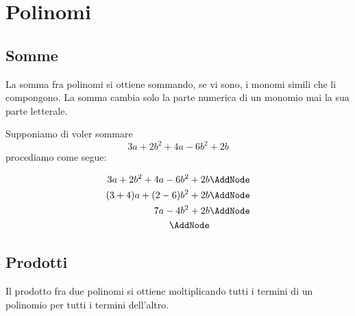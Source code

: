 \chapter{Polinomi}
\label{cha:polinomi}
\minitoc
\mtcskip                                %
\minilof                                %
\mtcskip                                %
\minilot
\section{Somme}
\label{sec:somme}
La somma fra polinomi si ottiene sommando, se vi sono, i monomi simili che li compongono. La somma cambia solo la parte numerica di un monomio mai la sua parte letterale. 
\begin{esempio}
Supponiamo di voler sommare\[ 3a+2b^2+4a-6b^2+2b\] procediamo come segue:
	 \begin{NodesList} %
	 	\begin{align*}
	 		3a+2b^2+4a-6b^2+2b&                           \AddNode\\
	 		(3+4)a+(2-6)b^2+2b&          \AddNode\\                                       		
	 		7a-4b^2+2b&   \AddNode\\
	 		\AddNode
	 	\end{align*}
	  \end{NodesList}
\end{esempio}
\section{Prodotti}
Il prodotto fra due polinomi si ottiene moltiplicando tutti i termini di un polinomio per tutti i termini dell'altro. 
